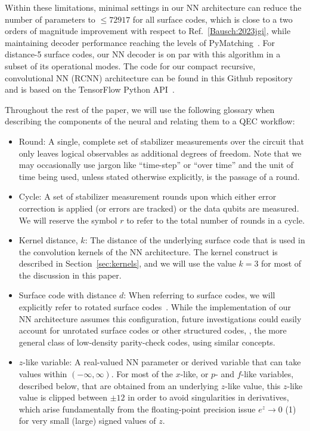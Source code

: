 Within these limitations, minimal settings in our NN architecture can reduce the number of parameters to $\leq 72917$ for all surface codes, which is close to a two orders of magnitude improvement with respect to Ref.~\ref{Bausch:2023jgi}, while maintaining decoder performance reaching the levels of PyMatching~\cite{Higgott:2023}. For distance-5 surface codes, our NN decoder is on par with this algorithm in a subset of its operational modes. The code for our compact recursive, convolutional NN (RCNN) architecture can be found in this Github repository~\cite{ourcode} and is based on the TensorFlow Python API~\cite{tensorflow,tensorflow2}.

Throughout the rest of the paper, we will use the following glossary when describing the components of the neural and relating them to a QEC workflow:
\begin{itemize}
\item Round: A single, complete set of stabilizer measurements over the circuit that only leaves logical observables as additional degrees of freedom.
Note that we may occasionally use jargon like ``time-step'' or ``over time'' and the unit of time being used, unless stated otherwise explicitly, is the passage of a round.
\item Cycle: A set of stabilizer measurement rounds upon which either error correction is applied (or errors are tracked) or the data qubits are measured. We will reserve the symbol $r$ to refer to the total number of rounds in a cycle.
\item Kernel distance, $k$: The distance of the underlying surface code that is used in the convolution kernels of the NN architecture. The kernel construct is described in Section~\ref{sec:kernels}, and we will use the value $k=3$ for most of the discussion in this paper.
\item Surface code with distance $d$: When referring to surface codes, we will explicitly refer to rotated surface codes~\cite{Bombin:2007}. While the implementation of our NN architecture assumes this configuration, future investigations could easily account for unrotated surface codes or other structured codes, \eg, the more general class of low-density parity-check codes, using similar concepts.
\item $z$-like variable: A real-valued NN parameter or derived variable that can take values within $(-\infty, \infty)$. For most of the $x$-like, or $p$- and $f$-like variables, described below, that are obtained from an underlying $z$-like value, this $z$-like value is clipped between $\pm12$ in order to avoid singularities in derivatives, which arise fundamentally from the floating-point precision issue $e^z \to 0$ (1) for very small (large) signed values of $z$.

\end{itemize}
